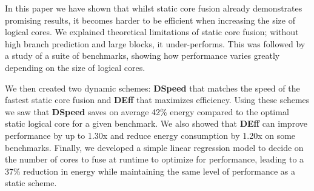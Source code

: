 In this paper we have shown that whilst static core fusion already demonstrates promising results, it becomes harder to be efficient when increasing the size of logical cores.
We explained theoretical limitations of static core fusion; without high branch prediction and large blocks, it under-performs.
This was followed by a study of a suite of benchmarks, showing how performance varies greatly depending on the size of logical cores. 

We then created two dynamic schemes: \textbf{DSpeed} that matches the speed of the fastest static core fusion and \textbf{DEff} that maximizes efficiency.
Using these schemes we saw that \textbf{DSpeed} saves on average 42\% energy compared to the optimal static logical core for a given benchmark.
We also showed that \textbf{DEff} can improve performance by up to 1.30x and reduce energy consumption by 1.20x on some benchmarks.
Finally, we developed a simple linear regression model to decide on the number of cores to fuse at runtime to optimize for performance, leading to a 37\% reduction in energy while maintaining the same level of performance as a static scheme.


